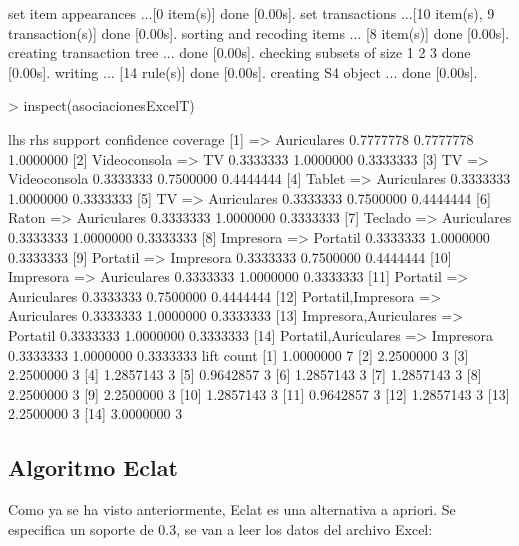 \documentclass [a4paper] {article}
\begin{document}
\begin{Schunk}
\begin{Soutput}
set item appearances ...[0 item(s)] done [0.00s].
set transactions ...[10 item(s), 9 transaction(s)] done [0.00s].
sorting and recoding items ... [8 item(s)] done [0.00s].
creating transaction tree ... done [0.00s].
checking subsets of size 1 2 3 done [0.00s].
writing ... [14 rule(s)] done [0.00s].
creating S4 object  ... done [0.00s].
\end{Soutput}
\begin{Sinput}
> inspect(asociacionesExcelT)
\end{Sinput}
\begin{Soutput}
     lhs                        rhs            support   confidence coverage 
[1]  {}                      => {Auriculares}  0.7777778 0.7777778  1.0000000
[2]  {Videoconsola}          => {TV}           0.3333333 1.0000000  0.3333333
[3]  {TV}                    => {Videoconsola} 0.3333333 0.7500000  0.4444444
[4]  {Tablet}                => {Auriculares}  0.3333333 1.0000000  0.3333333
[5]  {TV}                    => {Auriculares}  0.3333333 0.7500000  0.4444444
[6]  {Raton}                 => {Auriculares}  0.3333333 1.0000000  0.3333333
[7]  {Teclado}               => {Auriculares}  0.3333333 1.0000000  0.3333333
[8]  {Impresora}             => {Portatil}     0.3333333 1.0000000  0.3333333
[9]  {Portatil}              => {Impresora}    0.3333333 0.7500000  0.4444444
[10] {Impresora}             => {Auriculares}  0.3333333 1.0000000  0.3333333
[11] {Portatil}              => {Auriculares}  0.3333333 0.7500000  0.4444444
[12] {Portatil,Impresora}    => {Auriculares}  0.3333333 1.0000000  0.3333333
[13] {Impresora,Auriculares} => {Portatil}     0.3333333 1.0000000  0.3333333
[14] {Portatil,Auriculares}  => {Impresora}    0.3333333 1.0000000  0.3333333
     lift      count
[1]  1.0000000 7    
[2]  2.2500000 3    
[3]  2.2500000 3    
[4]  1.2857143 3    
[5]  0.9642857 3    
[6]  1.2857143 3    
[7]  1.2857143 3    
[8]  2.2500000 3    
[9]  2.2500000 3    
[10] 1.2857143 3    
[11] 0.9642857 3    
[12] 1.2857143 3    
[13] 2.2500000 3    
[14] 3.0000000 3    
\end{Soutput}
\end{Schunk}

\subsection{Algoritmo Eclat}
Como ya se ha visto anteriormente, Eclat es una alternativa a apriori.
Se especifica un soporte de 0.3, se van a leer los datos del archivo Excel:
\end{document}

